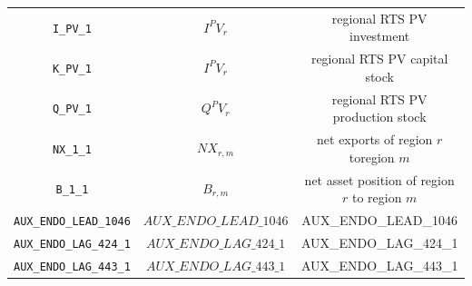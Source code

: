 \begin{center}
\begin{longtable}{ccc}
\texttt{I\_PV\_1} & ${I^PV_r}$ & regional RTS PV investment\\
\texttt{K\_PV\_1} & ${I^PV_r}$ & regional RTS PV capital stock\\
\texttt{Q\_PV\_1} & ${Q^PV_r}$ & regional RTS PV production stock\\
\texttt{NX\_1\_1} & ${NX_{r,m}}$ & net exports of region $r$toregion $m$\\
\texttt{B\_1\_1} & ${B_{r,m}}$ & net asset position of region $r$ to region $m$\\
\texttt{AUX\_ENDO\_LEAD\_1046} & $AUX\_ENDO\_LEAD\_1046$ & AUX\_ENDO\_LEAD\_1046\\
\texttt{AUX\_ENDO\_LAG\_424\_1} & $AUX\_ENDO\_LAG\_424\_1$ & AUX\_ENDO\_LAG\_424\_1\\
\texttt{AUX\_ENDO\_LAG\_443\_1} & $AUX\_ENDO\_LAG\_443\_1$ & AUX\_ENDO\_LAG\_443\_1\\
\hline%
\end{longtable}
\end{center}
